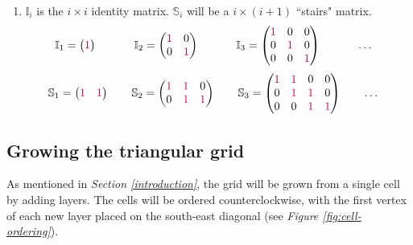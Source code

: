 \documentclass{article}
\begin{document}
\begin{enumerate}
\item 
$\mathbb{I}_i$ is the $i\times i$ identity matrix. $\mathbb{S}_i$ will be a $i\times (i+1)$ ``stairs" matrix.
\begin{equation}
    \mathbb{I}_1=
    \begin{pmatrix}
    {\color{purple}1}
    \end{pmatrix}
\qquad\quad\;
    \mathbb{I}_2=
    \begin{pmatrix}
    {\color{purple}1} & 0 \\
    0 & {\color{purple}1}
    \end{pmatrix}
\qquad\quad\;
    \mathbb{I}_3=
    \begin{pmatrix}
    {\color{purple}1} & 0 & 0 \\
    0 & {\color{purple}1} & 0 \\
    0 & 0 & {\color{purple}1} 
    \end{pmatrix}
\qquad\quad\;
    \hdots
\quad
\end{equation}
\begin{equation}
    \mathbb{S}_1=
    \begin{pmatrix}
    {\color{purple}1} & {\color{purple}1}
    \end{pmatrix}
\qquad
    \mathbb{S}_2=
    \begin{pmatrix}
    {\color{purple}1} & {\color{purple}1} & 0 \\
    0 & {\color{purple}1} & {\color{purple}1} 
    \end{pmatrix}
\qquad
    \mathbb{S}_3=
    \begin{pmatrix}
    {\color{purple}1} & {\color{purple}1} & 0 & 0 \\
    0 & {\color{purple}1} & {\color{purple}1} & 0 \\
    0 & 0 & {\color{purple}1} & {\color{purple}1} 
    \end{pmatrix}
\qquad
    \hdots
\quad
\end{equation}

\end{enumerate}

\subsection{Growing the triangular grid} \label{growing-the-grid}

As mentioned in \textit{Section \ref{introduction}}, the grid will be grown from a single cell by adding layers. The cells will be ordered counterclockwise, with the first vertex of each new layer placed on the south-east diagonal (see \textit{Figure \ref{fig:cell-ordering}}).
\end{document}
